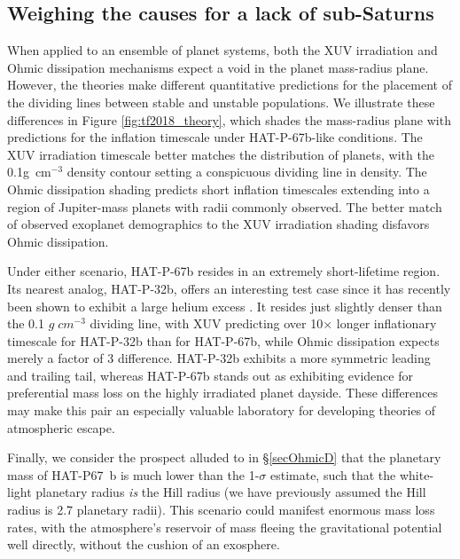 \documentclass[linenumbers, twocolumn, trackchanges]{aastex631}
\begin{document}
\subsection{Weighing the causes for a lack of sub-Saturns}\label{secLackofSaturns}
When applied to an ensemble of planet systems, both the XUV irradiation and Ohmic dissipation mechanisms expect a void in the planet mass-radius plane.  However, the theories make different quantitative predictions for the placement of the dividing lines between stable and unstable populations.  We illustrate these differences in Figure \ref{fig:tf2018_theory}, which shades the mass-radius plane with predictions for the inflation timescale under HAT-P-67b-like conditions.  The XUV irradiation timescale better matches the distribution of planets, with the 0.1g~cm$^{-3}$ density contour setting a conspicuous dividing line in density.  The Ohmic dissipation shading predicts short inflation timescales extending into a region of Jupiter-mass planets with radii commonly observed.  The better match of observed exoplanet demographics to the XUV irradiation shading disfavors Ohmic dissipation.

Under either scenario, HAT-P-67b resides in an extremely short-lifetime region.  Its nearest analog, HAT-P-32b, offers an interesting test case since it has recently been shown to exhibit a large helium excess \citep{doi:10.1126/sciadv.adf8736}.  It resides just slightly denser than the 0.1 $g\;cm^{-3}$ dividing line, with XUV predicting over 10$\times$ longer inflationary timescale for HAT-P-32b than for HAT-P-67b, while Ohmic dissipation expects merely a factor of 3 difference.  HAT-P-32b exhibits a more symmetric leading and trailing tail, whereas HAT-P-67b stands out as exhibiting evidence for preferential mass loss on the highly irradiated planet dayside.  These differences may make this pair an especially valuable laboratory for developing theories of atmospheric escape.

Finally, we consider the prospect alluded to in \S \ref{secOhmicD} that the planetary mass of HAT-P67~b is much lower than the 1-$\sigma$ estimate, such that the white-light planetary radius \emph{is} the Hill radius (we have previously assumed the Hill radius is 2.7 planetary radii).  This  scenario could manifest enormous mass loss rates, with the atmosphere's reservoir of mass fleeing the gravitational potential well directly, without the cushion of an exosphere.

\end{document}
